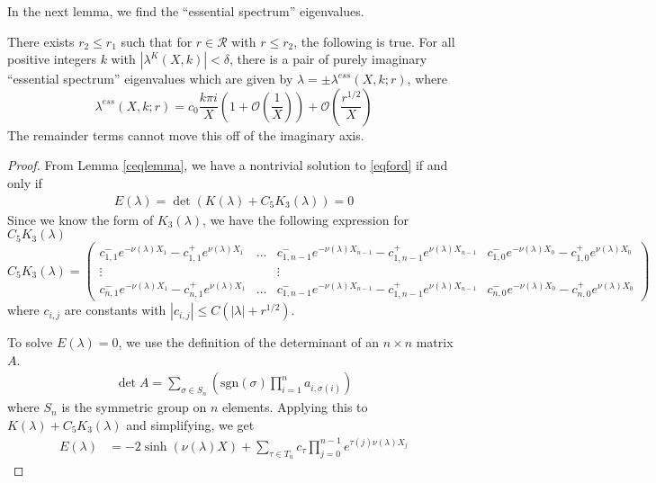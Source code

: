\documentclass[thesis.tex]{subfiles}
\begin{document}
In the next lemma, we find the ``essential spectrum'' eigenvalues.
\begin{lemma}\label{essspeclemma}
There exists $r_2 \leq r_1$ such that for $r \in \mathcal{R}$ with $r \leq r_2$, the following is true. For all positive integers $k$ with $|\lambda^K(X,k)| < \delta$, there is a pair of purely imaginary ``essential spectrum'' eigenvalues which are given by $\lambda = \pm \lambda^{ess}(X,k; r)$, where
\begin{equation}\label{lambdaess}
\lambda^{ess}(X, k; r) = c_0 \frac{k \pi i }{X} \left( 1 + \mathcal{O}\left( \frac{1}{X} \right)\right) + \mathcal{O}\left( \frac{r^{1/2}}{X} \right)
\end{equation}
The remainder terms cannot move this off of the imaginary axis.

\begin{proof}
From Lemma \ref{ceqlemma}, we have a nontrivial solution to \eqref{eqford} if and only if 
\begin{align*}
E(\lambda) = \det (K(\lambda) + C_5 K_3(\lambda)) = 0
\end{align*}
Since we know the form of $K_3(\lambda)$, we have the following expression for $C_5 K_3(\lambda)$
\[
C_5 K_3(\lambda) = 
\begin{pmatrix}
c_{1,1}^- e^{-\nu(\lambda)X_1} - c_{1,1}^+ e^{\nu(\lambda)X_1} 
& \dots & 
c_{1, n-1}^- e^{-\nu(\lambda)X_{n-1}} - c_{1,n-1}^+ e^{\nu(\lambda)X_{n-1}} &
c_{1,0}^- e^{-\nu(\lambda)X_0} - c_{1,0}^+ e^{\nu(\lambda)X_0}  \\
\vdots & & \vdots & \\
c_{n,1}^- e^{-\nu(\lambda)X_1} - c_{n,1}^+ e^{\nu(\lambda)X_1}
& \dots & 
c_{1, n-1}^- e^{-\nu(\lambda)X_{n-1}} - c_{1,n-1}^+ e^{\nu(\lambda)X_{n-1}} &
c_{n,0}^- e^{-\nu(\lambda)X_0} - c_{n,0}^+ e^{\nu(\lambda)X_0} 
\end{pmatrix}
\]
where $c_{i,j}$ are constants with $|c_{i,j}| \leq C(|\lambda| + r^{1/2})$. 

To solve $E(\lambda) = 0$, we use the definition of the determinant of an $n \times n$ matrix $A$.
\begin{align*}
\det A = \sum_{\sigma \in S_n} \left( \text{sgn}(\sigma) \prod_{i=1}^n a_{i, \sigma(i)} \right)
\end{align*}
where $S_n$ is the symmetric group on $n$ elements. Applying this to $K(\lambda) + C_5 K_3(\lambda)$ and simplifying, we get
\begin{align}\label{Elambdaess}
E(\lambda)
&= -2 \sinh(\nu(\lambda)X) + \sum_{\tau \in T_n}
c_\tau \prod_{j = 0}^{n-1} e^{\tau(j) \nu(\lambda)X_j}
\end{align}


\end{proof}
\end{lemma}
\end{document}
